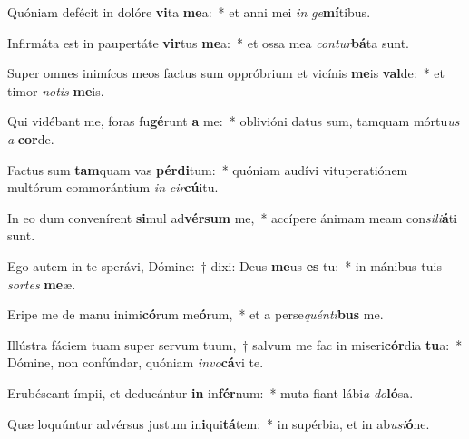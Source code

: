 \item Quóniam defécit in dolóre \textbf{vi}ta \textbf{me}a:~* et anni mei \textit{in} \textit{ge}\textbf{mí}tibus.
\item Infirmáta est in paupertáte \textbf{vir}tus \textbf{me}a:~* et ossa mea \textit{con}\textit{tur}\textbf{bá}ta sunt.
\item Super omnes inimícos meos factus sum oppróbrium et vicínis \textbf{me}is \textbf{val}de:~* et timor \textit{no}\textit{tis} \textbf{me}is.
\item Qui vidébant me, foras fu\textbf{gé}runt \textbf{a} me:~* oblivióni datus sum, tamquam mórtu\textit{us} \textit{a} \textbf{cor}de.
\item Factus sum \textbf{tam}quam vas \textbf{pér}\textbf{di}tum:~* quóniam audívi vituperatiónem multórum commorántium \textit{in} \textit{cir}\textbf{cú}itu.
\item In eo dum convenírent \textbf{si}mul ad\textbf{vér}\textbf{sum} me,~* accípere ánimam meam con\textit{si}\textit{li}\textbf{á}ti sunt.
\item Ego autem in te sperávi, Dómine:~† dixi: Deus \textbf{me}us \textbf{es} tu:~* in mánibus tuis \textit{sor}\textit{tes} \textbf{me}æ.
\item Eripe me de manu inimi\textbf{có}rum me\textbf{ó}rum,~* et a perse\textit{quén}\textit{ti}\textbf{bus} me.
\item Illústra fáciem tuam super servum tuum,~† salvum me fac in miseri\textbf{cór}dia \textbf{tu}a:~* Dómine, non confúndar, quóniam \textit{in}\textit{vo}\textbf{cá}vi te.
\item Erubéscant ímpii, et deducántur \textbf{in} in\textbf{fér}num:~* muta fiant lábi\textit{a} \textit{do}\textbf{ló}sa.
\item Quæ loquúntur advérsus justum in\textbf{i}qui\textbf{tá}tem:~* in supérbia, et in ab\textit{u}\textit{si}\textbf{ó}ne.
